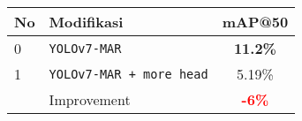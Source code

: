  \begin{tabular}{ l l c }
    \toprule[1.5pt]
    No & Modifikasi                                 &mAP@50 \\
    \midrule
    0  & \texttt{YOLOv7-MAR}                        & \textbf{11.2\%}\\
    1  & \texttt{YOLOv7-MAR + more head}            & 5.19\%\\
    \midrule
       & Improvement                                & \textbf{\textcolor{red}{-6\%}}\\
    \bottomrule[1.5pt]
  \end{tabular}